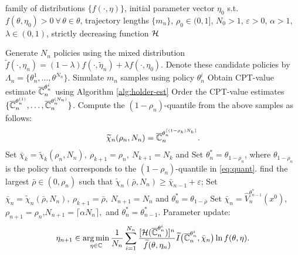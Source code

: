 \documentclass[11pt,letterpaper,english]{article}
\begin{document}
\begin{algorithm}
\begin{algorithmic}
  family of distributions $\{f(\cdot,\eta)\}$, initial parameter vector $\eta_0$ s.t. $f(\theta,\eta_0)>0 ~\forall\, \theta\in \theta$, trajectory lengths $\{m_n\}$, 
$\rho_0 \in (0,1]$, $N_0>1$,
$\varepsilon> 0$, $\alpha>1$, $\lambda \in(0,1)$,
strictly decreasing function
$\mathcal{H}\hspace*{-3pt}$.

	\Candidate
	    \State 
	    Generate $N_n$ policies using the mixed distribution $\widetilde f(\cdot,\eta_n)= (1-\lambda)f(\cdot,\widetilde\eta_n)+\lambda f(\cdot,\eta_0)$. 
	    \State Denote these candidate policies by $\Lambda_n=\{\theta^1_n, \ldots, \theta^{N_n}\}$.
	\EndCandidate    
	\Estimation
	      \State Simulate $m_n$ samples using policy $\theta^i_n$
	      \State Obtain CPT-value estimate $\overline {\mathbb{C}}_n^{\theta^i_n}$ using Algorithm \ref{alg:holder-est}
	      \EndFor
	\EndEstimation
	\Elite
	  \State Order the CPT-value estimates\footnotemark[1] $\{\overline {\mathbb{C}}_n^{\theta^{(1)}_n},\ldots,\overline {\mathbb{C}}_n^{\theta^{(N_n)}_n}\}$. 
	  \State Compute the $(1-\rho_n)$-quantile from the above samples as follows: 
	  \begin{align}
\widetilde \chi_{n}(\rho_n,N_n) = \overline {\mathbb{C}}_n^{\theta^{\lceil(1-\rho_k)N_k \rceil}_n}.\label{eq:quant}
\end{align}
	\EndElite
	\Thresholding
	    \State Set $\bar \chi_{k} = \widetilde \chi_{k}(\rho_n,N_n),~\rho_{k+1} = \rho_n,~N_{k+1} = N_{k}$ and \label{step:3a}
	    \State Set $\theta^*_{n} = \theta_{1-\rho_{n}}$, where $\theta_{1-\rho_{n}}$ is the policy that corresponds to the $(1-\rho_n)$-quantile in \eqref{eq:quant}.
	\Else
             \State find the largest $\bar \rho \in (0, \rho_n)$ such that $\widetilde\chi_{n}(\bar \rho,N_n)\geq \bar\chi_{n-1}+\varepsilon$;             
              \State Set $\bar \chi_{n} = \widetilde \chi_{n}(\bar \rho,N_n),~ \rho_{k+1}  = \bar \rho,~N_{n+1} = N_{n}$ and
              $\theta^*_{n} = \theta_{1- \bar \rho}$ \label{step:3b}
              \Else
	      \State Set $\bar \chi_{n}  = \widehat V_n^{\theta^*_{n-1}}(x^0)$,$\rho_{n+1} = \rho_n$,$N_{n+1} = \lceil\alpha N_{n}\rceil,$ and
          $\theta^*_{n} = \theta^*_{n-1}$.\label{step:3c}
	      \EndIf
         \EndIf
	\EndThresholding
	    \Update
		\State Parameter update\footnotemark[2]:  
		                         \begin{equation*} 
\eta_{n+1} \in \mathop{\rm arg\,min}_{\eta \in \mathbb{C}}\frac{1}{N_n}\sum_{i=1}^{N_n}\frac{[\mathcal{H}(\overline {\mathbb{C}}_n^{\theta^i_n})]^n}{\widetilde f(\theta,\eta_n)}
\widetilde I\big(\overline {\mathbb{C}}_n^{\theta^i_n},\bar \chi_{n}\big) \ln f(\theta,\eta).
                            \end{equation*}


\end{algorithmic}
\end{algorithm}
\end{document}
